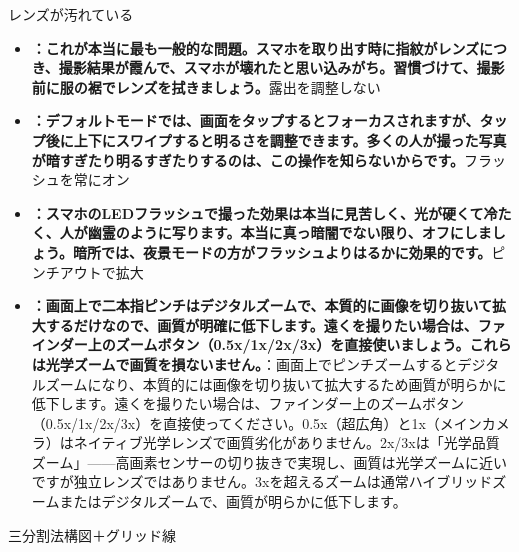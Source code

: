 


レンズが汚れている

\begin{itemize}
  \item \textbf{：これが本当に最も一般的な問題。スマホを取り出す時に指紋がレンズにつき、撮影結果が霞んで、スマホが壊れたと思い込みがち。習慣づけて、撮影前に服の裾でレンズを拭きましょう。}露出を調整しない
  \item \textbf{：デフォルトモードでは、画面をタップするとフォーカスされますが、タップ後に上下にスワイプすると明るさを調整できます。多くの人が撮った写真が暗すぎたり明るすぎたりするのは、この操作を知らないからです。}フラッシュを常にオン
  \item \textbf{：スマホのLEDフラッシュで撮った効果は本当に見苦しく、光が硬くて冷たく、人が幽霊のように写ります。本当に真っ暗闇でない限り、オフにしましょう。暗所では、夜景モードの方がフラッシュよりはるかに効果的です。}ピンチアウトで拡大
  \item \textbf{：画面上で二本指ピンチはデジタルズームで、本質的に画像を切り抜いて拡大するだけなので、画質が明確に低下します。遠くを撮りたい場合は、ファインダー上のズームボタン（0.5x/1x/2x/3x）を直接使いましょう。これらは光学ズームで画質を損ないません。}：画面上でピンチズームするとデジタルズームになり、本質的には画像を切り抜いて拡大するため画質が明らかに低下します。遠くを撮りたい場合は、ファインダー上のズームボタン（0.5x/1x/2x/3x）を直接使ってください。0.5x（超広角）と1x（メインカメラ）はネイティブ光学レンズで画質劣化がありません。2x/3xは「光学品質ズーム」——高画素センサーの切り抜きで実現し、画質は光学ズームに近いですが独立レンズではありません。3xを超えるズームは通常ハイブリッドズームまたはデジタルズームで、画質が明らかに低下します。
\end{itemize}


三分割法構図＋グリッド線

